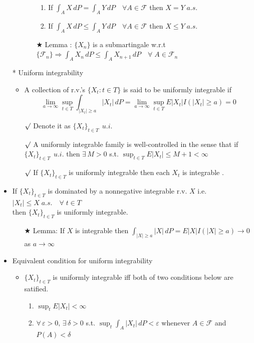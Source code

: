 \documentclass[12pt, A4]{article}
\newcommand{\rmk}{$\surd$}
\newcommand{\trick}{$\bigstar$}
\newcommand{\F}{\mathcal{F}}
\newcommand{\exist}{\exists\,}
\begin{document}
\begin{itemize}
\begin{itemize}
\begin{itemize}
			\begin{enumerate}
				\item If $\int_A X\, dP=\int_A Y \, dP\quad \forall A\in \F$ then $X=Y\; a.s.$ 
				\item If $\int_A X\, dP \leq \int_A Y \, dP\quad \forall A\in \F$ then $X\leq Y\; a.s.$ 
			\end{enumerate}
			\item[\trick] Lemma : $\{X_n\}$ is a submartingale w.r.t $\{\F_n\} \Rightarrow \int_A X_n\, dP \leq \int_A X_{n+1}\, dP\quad \forall\; A\in \F_n$
		\end{itemize} 
	\end{itemize}
	\item[*] Uniform integrability
	\begin{itemize}
		\item A collection of r.v.'s $\{X_t : t\in T\}$ is said to be uniformly integrable if 
		$$
			\lim_{a\rightarrow \infty} \sup_{t\in T} \int_{|X_t|\geq a}|X_t|\,dP = \lim_{a\rightarrow \infty} \sup_{t\in T} E|X_t|I(|X_t|\geq a) =0
		$$
		\item[\rmk] Denote it as $\{X_t\}_{t\in T}\;\,u.i.$
		\item[\rmk] A uniformly integrable family is well-controlled in the sense that if $\{X_t\}_{t\in T}\;\,u.i.$ then $\exist M>0$ s.t. $\sup_{t\in T}E|X_t|\leq M+1<\infty$
		\item[\rmk] If $\{X_t\}_{t\in T}$ is uniformly integrable then each $X_t$ is integrable .
	\end{itemize}
	\item If $\{X_t\}_{t\in T}$ is dominated by a nonnegative integrable r.v. $X$ \;i.e. $|X_t|\leq X\;a.s.\quad \forall\;t\in T$ \\ then $\{X_t\}_{t\in T}$ is uniformly integrable.
	\begin{itemize}
		\item[\trick] Lemma: If $X$ is integrable then $\int_{|X|\geq a} |X|\,dP=E|X|I(|X|\geq a)\rightarrow 0$ as $a\rightarrow \infty$
	\end{itemize}
	\item Equivalent condition for uniform integrability
	\begin{itemize}
		\item $\{X_t\}_{t\in T}$ is uniformly integrable iff both of two conditions below are satified. 
		\begin{enumerate}
			\item $\sup_t E|X_t|<\infty$
			\item $\forall \, \varepsilon>0,\, \exist \delta>0$  s.t. $\sup_t\int_A|X_t|\, dP<\varepsilon$ whenever $A\in \F$ and $P(A)<\delta$

\end{enumerate}
\end{itemize}
\end{itemize}
\end{document}
